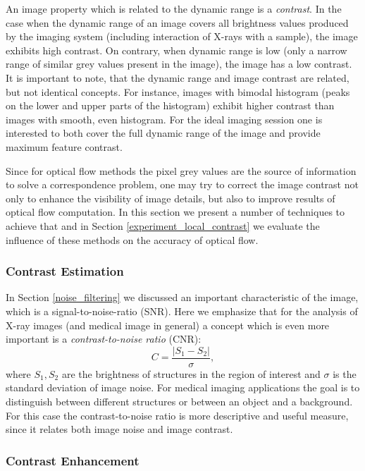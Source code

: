 An image property which is related to the dynamic range is a \textit{contrast}. In the case when the dynamic range of an image covers all brightness values produced by the imaging system (including interaction of X-rays with a sample), the image exhibits high contrast. On contrary, when dynamic range is low (only a narrow range of similar grey values present in the image), the image has a low contrast. 
It is important to note, that the dynamic range and image contrast are related, but not identical concepts. For instance, images with bimodal histogram (peaks on the lower and upper parts of the histogram) exhibit higher contrast than images with smooth, even histogram.  For the ideal imaging session one is interested to both cover the full dynamic range of the image and provide maximum feature contrast.    

Since for optical flow methods the pixel grey values are the source of information to solve a correspondence problem, one may try to correct the image contrast not only to enhance the visibility of image details, but also to improve results of optical flow computation. In this section we present a number of techniques to achieve that and in Section \ref{experiment_local_contrast} we evaluate the influence of these methods on the accuracy of optical flow.    



\subsubsection{Contrast Estimation}
\label{contrast_estimation}

In Section \ref{noise_filtering} we discussed an important characteristic of the image, which is a signal-to-noise-ratio (SNR). Here we emphasize that for the analysis of X-ray images (and medical image in general) a concept which is even more important is a \textit{contrast-to-noise ratio} (CNR):
$$C = \frac{|S_1 - S_2|}{\sigma},$$
where $S_1, S_2$ are the brightness of structures in the region of interest and $\sigma$ is the standard deviation of image noise.  
For medical imaging applications the goal is to distinguish between different structures or between an object and a background. For this case the contrast-to-noise ratio is more descriptive and useful measure, since it relates both image noise and image contrast.  


\subsubsection{Contrast Enhancement}
\label{contrast_enhancement}

